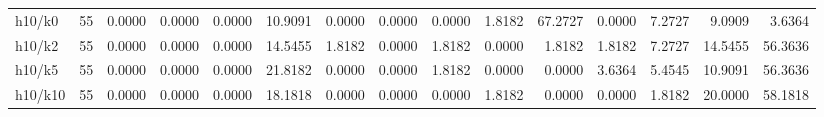 \begin{tabular}{lrrrrrrrrrrrrrr}
h10/k0 & 55 & 0.0000 & 0.0000 & 0.0000 & 10.9091 & 0.0000 & 0.0000 & 0.0000 & 1.8182 & 67.2727 & 0.0000 & 7.2727 & 9.0909 & 3.6364 \\
h10/k2 & 55 & 0.0000 & 0.0000 & 0.0000 & 14.5455 & 1.8182 & 0.0000 & 1.8182 & 0.0000 & 1.8182 & 1.8182 & 7.2727 & 14.5455 & 56.3636 \\
h10/k5 & 55 & 0.0000 & 0.0000 & 0.0000 & 21.8182 & 0.0000 & 0.0000 & 1.8182 & 0.0000 & 0.0000 & 3.6364 & 5.4545 & 10.9091 & 56.3636 \\
h10/k10 & 55 & 0.0000 & 0.0000 & 0.0000 & 18.1818 & 0.0000 & 0.0000 & 0.0000 & 1.8182 & 0.0000 & 0.0000 & 1.8182 & 20.0000 & 58.1818 \\
\bottomrule
\end{tabular}
